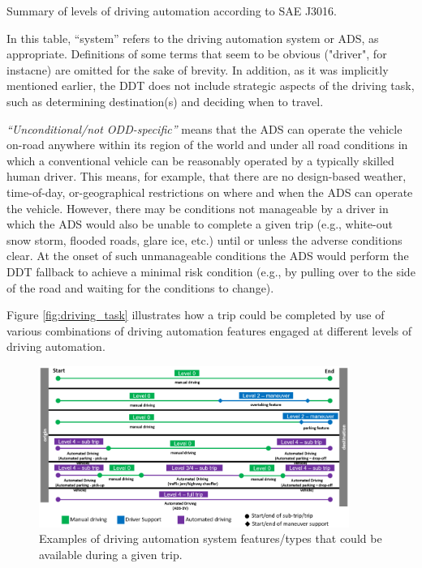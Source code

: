 \begin{table}[]
\begin{adjustbox}{width=\textwidth}
\end{adjustbox}
  \vspace{0.35cm}
  \caption{Summary of levels of driving automation according to SAE J3016.}
  \label{tab:SAEJ3016}
\end{table}

In this table, “system” refers to the driving automation system or ADS, as appropriate.
Definitions of some terms that seem to be obvious ("driver", for instacne) are omitted for the sake of brevity.
In addition, as it was implicitly mentioned earlier, the DDT does not include strategic aspects of the driving task, such as determining destination(s) and deciding when to travel.

\begin{note}
  \textit{“Unconditional/not ODD-specific”} means that the ADS can operate the vehicle on-road anywhere within its region of the world and under all road conditions in which a conventional vehicle can be reasonably operated by a typically skilled human driver. 
  This means, for example, that there are no design-based weather, time-of-day, or-geographical restrictions on where and when the ADS can operate the vehicle. 
  However, there may be conditions not manageable by a driver in which the ADS would also be unable to complete a given trip (e.g., white-out snow storm, flooded roads, glare ice, etc.) until or unless the adverse conditions clear. 
  At the onset of such unmanageable conditions the ADS would perform the DDT fallback to achieve a minimal risk condition (e.g., by pulling over to the side of the road and waiting for the conditions to change). 
\end{note}

Figure \ref{fig:driving_task} illustrates how a trip could be completed by use of various combinations of driving automation features engaged at different levels of driving automation.

\begin{figure}[!ht]
	\centering
	\includegraphics[width=0.9\textwidth]{images/driving_automation.PNG}
	\caption{Examples of driving automation system features/types that could be available during a given trip.}
  \label{img:driving_automation}
\end{figure}

